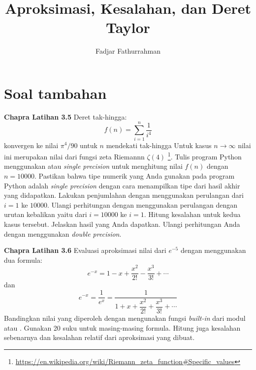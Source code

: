 



\title{Aproksimasi, Kesalahan, dan Deret Taylor}
\author{Fadjar Fathurrahman}
\date{}
\maketitle












\section{Soal tambahan}

\begin{soal}
\textbf{Chapra Latihan 3.5}
Deret tak-hingga:
\begin{equation*}
f(n) = \sum_{i=1}^{n} \frac{1}{i^4}
\end{equation*}
konvergen ke nilai $\pi^{4}/90$ untuk $n$ mendekati tak-hingga
Untuk kasus $n \rightarrow \infty$ nilai ini merupakan nilai dari fungsi
zeta Riemannn $\zeta(4)$
\footnote{{\scriptsize\url{https://en.wikipedia.org/wiki/Riemann_zeta_function\#Specific_values}}}.
Tulis program Python menggunakan  atau
\textit{single precision} untuk menghitung
nilai $f(n)$ dengan $n=10000$.
Pastikan bahwa tipe numerik yang Anda gunakan pada program Python
adalah \textit{single precision} dengan cara menampilkan tipe dari hasil akhir yang didapatkan.
Lakukan penjumlahan dengan menggunakan perulangan
dari $i=1$ ke $10000$. Ulangi perhitungan dengan menggunakan perulangan
dengan urutan kebalikan yaitu dari $i=10000$ ke $i=1$. Hitung kesalahan untuk
kedua kasus tersebut.
Jelaskan hasil yang Anda dapatkan.
Ulangi perhitungan Anda dengan menggunakan \textit{double precision}.
\end{soal}

\begin{soal}
\textbf{Chapra Latihan 3.6}
Evaluasi aproksimasi nilai dari $e^{-5}$ dengan menggunakan dua formula:
\begin{equation}
e^{-x} = 1 - x + \frac{x^2}{2!} - \frac{x^3}{3!} + \cdots
\end{equation}
dan
\begin{equation}
e^{-x} = \frac{1}{e^{x}} = \frac{1}{1 + x + \dfrac{x^2}{2!} + \dfrac{x^3}{3!} + \cdots}
\end{equation}
Bandingkan nilai yang diperoleh dengan mengunakan fungsi \textit{built-in} dari modul
 atau . Gunakan 20 suku untuk masing-masing formula.
Hitung juga kesalahan sebenarnya dan kesalahan relatif dari aproksimasi yang dibuat.
\end{soal}


